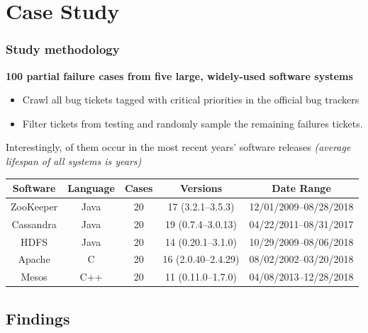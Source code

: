 \documentclass[aspectratio=169]{beamer}
\newcommand{\red}[1]{{\color{red}{#1}}}
\begin{document}
\section{Case Study}
\begin{frame}
    \frametitle{Study methodology}
    \begin{block}{\textbf{100 partial failure cases from five large, widely-used software systems}}
        \begin{itemize}
            \item Crawl all bug tickets tagged with critical priorities in the official
                  bug trackers
            \item Filter tickets from testing and randomly
                  sample the remaining failures tickets.
        \end{itemize}
    \end{block}

    Interestingly, \red{54\%} of them occur in the most recent \red{three} years’ software
    releases \textit{(average lifespan of all systems is \red{9} years)}
    \begin{center}
        \begin{tabular}{c|c|c|c|c}
            \toprule
            Software  & Language & Cases & Versions           & Date Range            \\
            \midrule
            ZooKeeper & Java     & 20    & 17 (3.2.1–3.5.3)   & 12/01/2009–08/28/2018 \\
            Cassandra & Java     & 20    & 19 (0.7.4–3.0.13)  & 04/22/2011–08/31/2017 \\
            HDFS      & Java     & 20    & 14 (0.20.1–3.1.0)  & 10/29/2009–08/06/2018 \\
            Apache    & C        & 20    & 16 (2.0.40–2.4.29) & 08/02/2002–03/20/2018 \\
            Mesos     & C++      & 20    & 11 (0.11.0–1.7.0)  & 04/08/2013–12/28/2018 \\
            \bottomrule
        \end{tabular}
    \end{center}
\end{frame}

\subsection{Findings}
\end{document}

